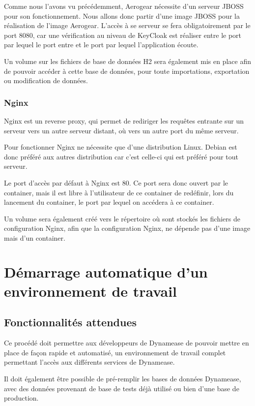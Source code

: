Comme nous l'avons vu précédemment, Aerogear nécessite d'un serveur JBOSS pour son fonctionnement. Nous allons donc partir d'une image JBOSS pour la réalisation de l'image Aerogear. L'accès à se serveur se fera obligatoirement par le port 8080, car une vérification au niveau de KeyCloak est réaliser entre le port par lequel le port entre et le port par lequel l'application écoute.

Un volume sur les fichiers de base de données H2 sera également mis en place afin de pouvoir accéder à cette base de données, pour toute importations, exportation ou modification de données. 

\subsubsection{Nginx}

Nginx est un reverse proxy, qui permet de rediriger les requêtes entrante sur un serveur vers un autre serveur distant, où vers un autre port du même serveur.

Pour fonctionner Nginx ne nécessite que d'une distribution Linux. Debian est donc préféré aux autres distribution car c'est celle-ci qui est préféré pour tout serveur.

Le port d'accès par défaut à Nginx est 80. Ce port sera donc ouvert par le container, mais il est libre à l'utilisateur de ce container de redéfinir, lors du lancement du container, le port par lequel on accédera à ce container.

Un volume sera également créé vers le répertoire où sont stockés les fichiers de configuration Nginx, afin que la configuration Nginx, ne dépende pas d'une image mais d'un container.

\section{Démarrage automatique d'un environnement de travail}

\subsection{Fonctionnalités attendues}

Ce procédé doit permettre aux développeurs de Dynamease de pouvoir mettre en place de façon rapide et automatisé, un environnement de travail complet permettant l'accès aux différents services de Dynamease. 

Il doit également être possible de pré-remplir les bases de données Dynamease, avec des données provenant de base de tests déjà utilisé ou bien d'une base de production.

